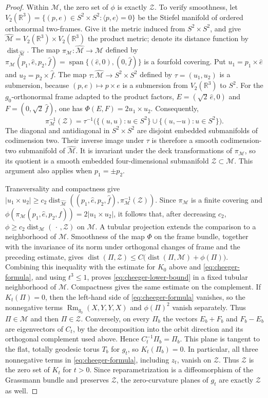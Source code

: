 \documentclass[11pt]{article}
\theoremstyle{definition}
\theoremstyle{remark}
\newcommand{\R}{\mathbb R}
\newcommand{\cM}{\mathcal M}
\newcommand{\cZ}{\mathcal Z}
\newcommand{\Rm}{\operatorname{Rm}}
\newcommand{\Span}{\operatorname{span}}
\newcommand{\dist}{\operatorname{dist}}
\begin{document}
\begin{proof}
Within $\cM$, the zero set of $\phi$ is exactly $\cZ$.  To verify
smoothness, let
$V_2(\R^3)=\{(p,e)\in S^2\times S^2:\langle p,e\rangle=0\}$ be the Stiefel
manifold of ordered orthonormal two-frames.  Give it the metric induced from
$S^2\times S^2$, and give
$\widehat{\cM}=V_2(\R^3)\times V_2(\R^3)$ the product metric; denote its
distance function by $\dist_{\widehat{\cM}}$.  The map
$\pi_{\cM}:\widehat{\cM}\to\cM$ defined by
$\pi_{\cM}(p_1,\widehat e,p_2,\widehat f)
=\Span\{(\widehat e,0),(0,\widehat f)\}$ is a fourfold covering.  Put
$u_1=p_1\times\widehat e$ and
$u_2=p_2\times\widehat f$.  The map
$\tau:\widehat{\cM}\to S^2\times S^2$ defined by $\tau=(u_1,u_2)$ is a submersion,
because $(p,e)\mapsto p\times e$ is a submersion from $V_2(\R^3)$ to $S^2$.
For the $g_0$-orthonormal frame adapted to the product factors,
$E=(\sqrt2\,\widehat e,0)$ and $F=(0,\sqrt2\,\widehat f)$, one has
$\Phi(E,F)=2u_1\times u_2$.  Consequently,
\[
 \pi_{\cM}^{-1}(\cZ)=
 \tau^{-1}\bigl(\{(u,u):u\in S^2\}\cup\{(u,-u):u\in S^2\}\bigr).
\]
The diagonal and antidiagonal in $S^2\times S^2$ are disjoint embedded
submanifolds of codimension two.  Their inverse image under $\tau$ is
therefore a smooth codimension-two submanifold of $\widehat{\cM}$.  It is
invariant under the deck transformations of $\pi_{\cM}$, so its quotient is a
smooth embedded four-dimensional submanifold $\cZ\subset\cM$.  This argument
also applies when $p_1=\pm p_2$.

Transversality and compactness give
$|u_1\times u_2|\geq c_2\dist_{\widehat{\cM}}
((p_1,\widehat e,p_2,\widehat f),\pi_{\cM}^{-1}(\cZ))$.
Since $\pi_{\cM}$ is a finite covering and
$\phi(\pi_{\cM}(p_1,\widehat e,p_2,\widehat f))=2|u_1\times u_2|$, it follows that,
after decreasing $c_2$,
$\phi\geq c_2\dist_{\cM}(\,\cdot\,,\cZ)$ on $\cM$.
A tubular projection extends the comparison to a neighborhood of $\cM$.
Smoothness of the map $\Phi$ on the frame bundle, together with the invariance of
its norm under orthogonal changes of frame and the preceding estimate, gives
$\dist(\Pi,\cZ)\leq
C\bigl(\dist(\Pi,\cM)+\phi(\Pi)\bigr)$.
Combining this inequality with the estimate for $K_0$ above and
\eqref{eq:cheeger-formula}, and using $t^3\leq1$, proves
\eqref{eq:cheeger-lower-bound} in a fixed tubular neighborhood of $\cM$.
Compactness gives the same estimate on the complement.  If $K_t(\Pi)=0$, then the left-hand
side of \eqref{eq:cheeger-formula} vanishes, so the nonnegative terms
$\Rm_{g_0}(X,Y,Y,X)$ and $\phi(\Pi)^2$ vanish separately.
Thus $\Pi\in\cM$ and then $\Pi\in\cZ$.  Conversely, on every
$\Pi_b$ the vectors $E_b+F_b$ and $F_b-E_b$ are eigenvectors of $C_t$,
by the decomposition into the orbit direction and its orthogonal complement
used above.  Hence
$C_t^{-1}\Pi_b=\Pi_b$.  This plane is tangent to the flat, totally geodesic
torus $T_b$ for $g_t$, so $K_t(\Pi_b)=0$.  In
particular, all three nonnegative terms in \eqref{eq:cheeger-formula},
including $z_t$, vanish on $\cZ$.  Thus $\cZ$ is the zero set of $K_t$ for
$t>0$.  Since
reparametrization is a diffeomorphism of the Grassmann bundle and preserves
$\cZ$, the zero-curvature planes of $g_t$ are exactly $\cZ$ as well.
\end{proof}
\end{document}
